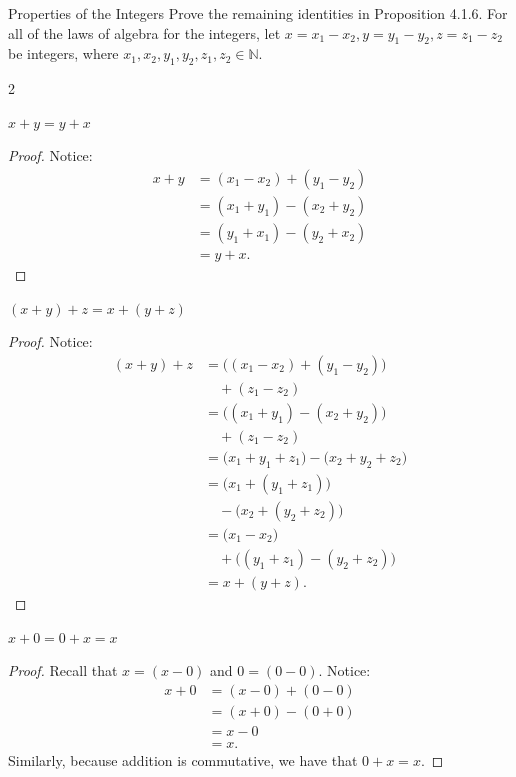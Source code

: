 \break
\begin{problem}{Properties of the Integers}
	Prove the remaining identities in Proposition 4.1.6. For all of the laws of algebra for the integers, 
	let $x = x_1 \minus x_2, y = y_1 \minus y_2, z = z_1 \minus z_2$ be integers, where $x_1, x_2, y_1, y_2, z_1, z_2 \in \mathbb{N}.$
\end{problem}

\begin{multicols}{2}
\begin{proposition}
	$x + y = y + x$
\end{proposition}
\begin{proof}
	Notice:
	\begin{align*}
		x + y &= (x_1 \minus x_2) + (y_1 \minus y_2) \\
		&= (x_1 + y_1) \minus (x_2 + y_2) \\
		&= (y_1 + x_1) \minus (y_2  + x_2) \\\
		&= y + x.
	\end{align*}
\end{proof}
\begin{proposition}
	$(x+y)+z =x+(y+z)$
\end{proposition}
\begin{proof}
	Notice:
	\begin{align*}
		(x+y) + z &= \big( (x_1 \minus x_2) + (y_1 \minus y_2) \big) \\
		&\quad + (z_1 \minus z_2) \\\
		&= \big((x_1 + y_1) \minus (x_2 + y_2) \big) \\
		&\quad + (z_1 \minus z_2)\\
		&= \big(x_1 + y_1 + z_1\big) \minus \big(x_2 + y_2 + z_2\big) \\
		&= \big(x_1 + (y_1 + z_1)\big) \\
		&\quad \minus \big(x_2 + (y_2 + z_2)\big) \\
		&= \big(x_1 \minus x_2) \\
		&\quad + \big((y_1 + z_1) \minus (y_2 + z_2)) \\
		&= x + (y+z).
	\end{align*}
\end{proof}
\begin{proposition}
	$x+0 = 0+x = x$
\end{proposition}
\begin{proof}
	Recall that $x = (x \minus 0)$ and $0 = (0 \minus 0)$. 
	Notice:
	\begin{align*}
		x + 0 &= (x \minus 0) + (0 \minus 0) \\
		&= (x + 0) \minus (0 + 0) \\
		&= x \minus 0 \\
		&= x.
	\end{align*}
	Similarly, because addition is commutative, we have that $0 + x = x.$
\end{proof}


\end{multicols}
